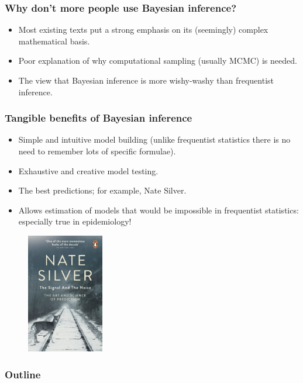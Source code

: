 \documentclass[handout]{beamer}
\begin{document}
\begin{frame}
	\frametitle{Why don't more people use Bayesian inference?}
	
	\begin{itemize}
		\item<2-> Most existing texts put a strong emphasis on its (seemingly) complex mathematical basis.
		\item<3-> Poor explanation of why computational sampling (usually MCMC) is needed.
		\item<5-> The view that Bayesian inference is more wishy-washy than frequentist inference. 
	\end{itemize}
\end{frame}

\begin{frame}
	\frametitle{Tangible benefits of Bayesian inference}
	
	\begin{itemize}
		\item<2-> Simple and intuitive model building (unlike frequentist statistics there is no need to remember lots of specific formulae).
		\item<3-> Exhaustive and creative model testing.
		\item<4-> The best predictions; for example, Nate Silver.
		\item<5-> Allows estimation of models that would be impossible in frequentist statistics: especially true in epidemiology!
	\end{itemize}
	
	\begin{figure}[ht]
		\centerline{\includegraphics[width=0.3\textwidth]{./figures/nateSilver.jpg}}
	\end{figure}
	
\end{frame}

\begin{frame}
	\frametitle{Outline}
	\tableofcontents
\end{frame}
\end{document}
